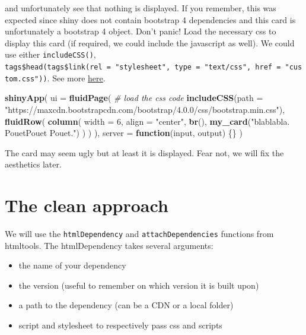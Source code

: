 \documentclass[
]{book}
\newenvironment{Shaded}{\begin{snugshade}}{\end{snugshade}}
\newcommand{\CommentTok}[1]{\textcolor[rgb]{0.56,0.35,0.01}{\textit{#1}}}
\newcommand{\ControlFlowTok}[1]{\textcolor[rgb]{0.13,0.29,0.53}{\textbf{#1}}}
\newcommand{\DataTypeTok}[1]{\textcolor[rgb]{0.13,0.29,0.53}{#1}}
\newcommand{\DecValTok}[1]{\textcolor[rgb]{0.00,0.00,0.81}{#1}}
\newcommand{\KeywordTok}[1]{\textcolor[rgb]{0.13,0.29,0.53}{\textbf{#1}}}
\newcommand{\NormalTok}[1]{#1}
\newcommand{\StringTok}[1]{\textcolor[rgb]{0.31,0.60,0.02}{#1}}
\providecommand{\tightlist}{%
  \setlength{\itemsep}{0pt}\setlength{\parskip}{0pt}}
\begin{document}
and unfortunately see that nothing is displayed. If you remember, this was expected since
shiny does not contain bootstrap 4 dependencies and this card is unfortunately a
bootstrap 4 object. Don't panic! Load the necessary css to display
this card (if required, we could include the javascript as well). We could use either
\texttt{includeCSS()}, \texttt{tags\$head(tags\$link(rel\ =\ "stylesheet",\ type\ =\ "text/css",\ href\ =\ "custom.css"))}. See
more \href{https://shiny.rstudio.com/articles/css.html}{here}.

\begin{Shaded}
\begin{Highlighting}[]
\KeywordTok{shinyApp}\NormalTok{(}
  \DataTypeTok{ui =} \KeywordTok{fluidPage}\NormalTok{(}
    \CommentTok{# load the css code}
    \KeywordTok{includeCSS}\NormalTok{(}\DataTypeTok{path =} \StringTok{"https://maxcdn.bootstrapcdn.com/bootstrap/4.0.0/css/bootstrap.min.css"}\NormalTok{),}
    \KeywordTok{fluidRow}\NormalTok{(}
      \KeywordTok{column}\NormalTok{(}
        \DataTypeTok{width =} \DecValTok{6}\NormalTok{,}
        \DataTypeTok{align =} \StringTok{"center"}\NormalTok{,}
        \KeywordTok{br}\NormalTok{(),}
        \KeywordTok{my_card}\NormalTok{(}\StringTok{"blablabla. PouetPouet Pouet."}\NormalTok{)}
\NormalTok{      )}
\NormalTok{    )}
\NormalTok{  ),}
  \DataTypeTok{server =} \ControlFlowTok{function}\NormalTok{(input, output) \{\}}
\NormalTok{)}
\end{Highlighting}
\end{Shaded}

The card may seem ugly but at least it is displayed. Fear not, we will fix the aesthetics later.

\hypertarget{the-clean-approach}{%
\section{The clean approach}\label{the-clean-approach}}

We will use the \texttt{htmlDependency} and \texttt{attachDependencies} functions from htmltools.
The htmlDependency takes several arguments:

\begin{itemize}
\tightlist
\item
  the name of your dependency
\item
  the version (useful to remember on which version it is built upon)
\item
  a path to the dependency (can be a CDN or a local folder)
\item
  script and stylesheet to respectively pass css and scripts
\end{itemize}
\end{document}
